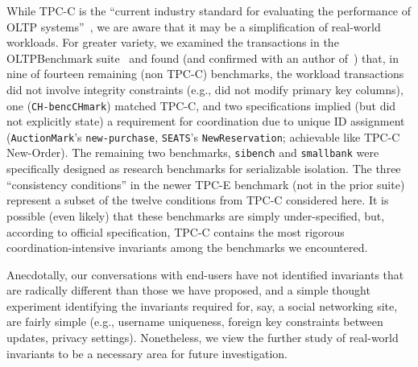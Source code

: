  While TPC-C is the ``current
industry standard for evaluating the performance of OLTP
systems''~\cite{oltpbench}, we are aware that it may be a
simplification of real-world workloads. For greater variety, we
examined the transactions in the OLTPBenchmark suite~\cite{oltpbench}
and found (and confirmed with an author of~\cite{oltpbench}) that, in
nine of fourteen remaining (non TPC-C) benchmarks, the workload
transactions did not involve integrity constraints (e.g., did not
modify primary key columns), one (\texttt{CH-bencCHmark}) matched
TPC-C, and two specifications implied (but did not explicitly state) a
requirement for coordination due to unique ID assignment
(\texttt{AuctionMark}'s \texttt{new-purchase}, \texttt{SEATS}'s
\texttt{NewReservation}; achievable like TPC-C New-Order). The
remaining two benchmarks, \texttt{sibench} and \texttt{smallbank} were
specifically designed as research benchmarks for serializable
isolation. The three ``consistency conditions'' in the newer TPC-E
benchmark (not in the prior suite) represent a subset of the twelve
conditions from TPC-C considered here. It is possible (even likely)
that these benchmarks are simply under-specified, but, according to
official specification, TPC-C contains the most rigorous
coordination-intensive invariants among the benchmarks we encountered.

Anecdotally, our conversations with end-users have not identified
invariants that are radically different than those we have proposed,
and a simple thought experiment identifying the invariants required
for, say, a social networking site, are fairly simple (e.g., username
uniqueness, foreign key constraints between updates, privacy
settings). Nonetheless, we view the further study of real-world
invariants to be a necessary area for future investigation.


